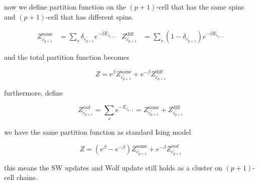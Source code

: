 \documentclass[11pt]{article}
\begin{document}
now we define partition function on the $(p+1)$-cell that has the same
spins and $(p+1)$-cell that has different spins.

\begin{equation}
    \begin{aligned}
        Z_{c^{\prime}_{p+1}}^{\text{same}} &= \sum_{s} \delta_{c_{p+1}^{\prime}} e^{-\beta E_{c^{\prime}_{p+1}}}
        &Z_{c^{\prime}_{p+1}}^{\text{diff}} &= \sum_{s} (1 - \delta_{c_{p+1}^{\prime}}) e^{-\beta E_{c^{\prime}_{p+1}}}
    \end{aligned}
\end{equation}

and the total partition function becomes

\begin{equation}
    Z = e^{\beta} Z_{c^{\prime}_{p+1}}^{\text{same}} + e^{-\beta}Z_{c^{\prime}_{p+1}}^{\text{diff}}
\end{equation}

furthermore, define

\begin{equation}
    Z_{c^{\prime}_{p+1}}^{ind} = \sum_{s} e^{-E_{c^{\prime}_{p+1}}} = Z_{c^{\prime}_{p+1}}^{\text{same}} + Z_{c^{\prime}_{p+1}}^{\text{diff}}
\end{equation}

we have the same partition function as standard Ising model

\begin{equation}
    Z = (e^{\beta} - e^{-\beta}) Z_{c^{\prime}_{p+1}}^{\text{same}} + e^{-\beta} Z_{c_{p+1}^{\prime}}^{ind}
\end{equation}

this means the SW updates and Wolf update still holds as a cluster
on $(p+1)$-cell chains.



\end{document}
